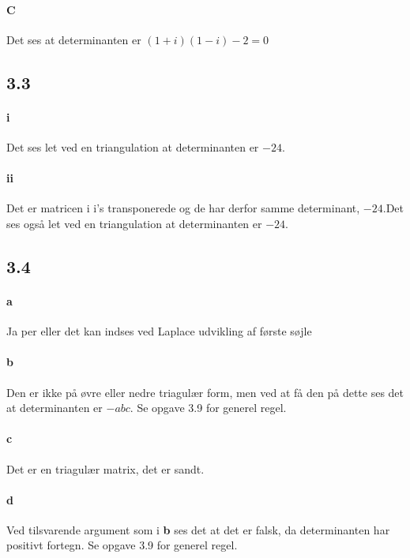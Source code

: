 			\paragraph{C} Det ses at determinanten er $(1+i)(1-i)-2=0$

		\subsection{3.3}

			\paragraph{i} Det ses let ved en triangulation at determinanten er $-24$.

			\paragraph{ii} Det er matricen i i's transponerede og de har derfor samme determinant, $-24$.Det ses også let ved en triangulation at determinanten er $-24$.

		\subsection{3.4}

			\paragraph{a} Ja per \cite[Sætning 3.2.1]{hesselholt2017} eller det kan indses ved Laplace udvikling af første søjle

			\paragraph{b} Den er ikke på øvre eller nedre triagulær form, men ved at få den på dette ses det at determinanten er $-abc$. Se opgave 3.9 for generel regel.

			\paragraph{c} Det er en triagulær matrix, det er sandt.

			\paragraph{d} Ved tilsvarende argument som i \textbf{b} ses det at det er falsk, da determinanten har positivt fortegn. Se opgave 3.9 for generel regel.

